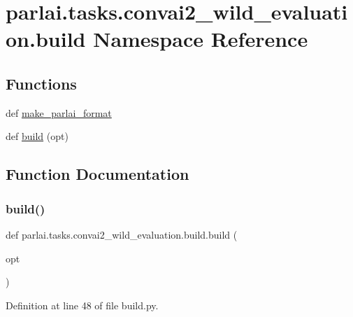 \hypertarget{namespaceparlai_1_1tasks_1_1convai2__wild__evaluation_1_1build}{}\section{parlai.\+tasks.\+convai2\+\_\+wild\+\_\+evaluation.\+build Namespace Reference}
\label{namespaceparlai_1_1tasks_1_1convai2__wild__evaluation_1_1build}
\subsection*{Functions}
\begin{DoxyCompactItemize}
\item 
def \hyperlink{namespaceparlai_1_1tasks_1_1convai2__wild__evaluation_1_1build_a6c2b84806e2cb18c6eedb72d161dec5e}{make\+\_\+parlai\+\_\+format}
\item 
def \hyperlink{namespaceparlai_1_1tasks_1_1convai2__wild__evaluation_1_1build_a7f46320f8766498ee5f87f68e24da31b}{build} (opt)
\end{DoxyCompactItemize}


\subsection{Function Documentation}
\mbox{\label{namespaceparlai_1_1tasks_1_1convai2__wild__evaluation_1_1build_a7f46320f8766498ee5f87f68e24da31b}} 
\subsubsection{\texorpdfstring{build()}{build()}}
{\footnotesize\ttfamily def parlai.\+tasks.\+convai2\+\_\+wild\+\_\+evaluation.\+build.\+build (\begin{DoxyParamCaption}\item[{}]{opt }\end{DoxyParamCaption})}



Definition at line 48 of file build.\+py.



